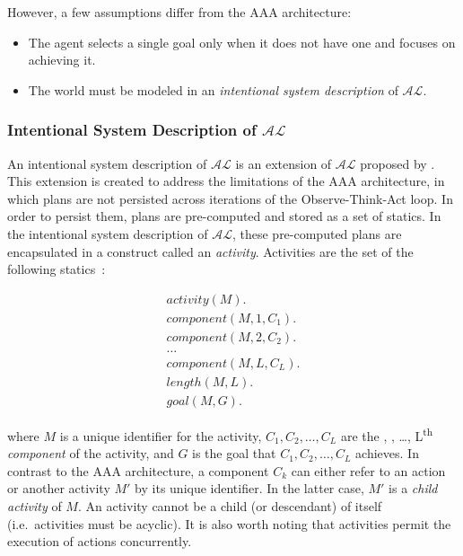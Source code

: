 However, a few assumptions differ from the AAA architecture:

\begin{itemize}
    \item The agent selects a single goal only when it does not have one and focuses on achieving it.
    \item The world must be modeled in an \textit{intentional system description} of $\mathcal{AL}$.
\end{itemize}

\subsubsection{Intentional System Description of $\mathcal{AL}$}
\label{subsubsec:intentional_action_language_al}

An intentional system description of $\mathcal{AL}$ is an extension of $\mathcal{AL}$ proposed by \citet{blount_architecture_2013}.
This extension is created to address the limitations of the AAA architecture, in which plans are not persisted across iterations of the Observe-Think-Act loop.
In order to persist them, plans are pre-computed and stored as a set of statics.
In the intentional system description of $\mathcal{AL}$, these pre-computed plans are encapsulated in a construct called an \textit{activity}.
Activities are the set of the following statics~\citep{blount_architecture_2013, blount_towards_2014}:

\begin{gather}
    activity(M). \\
    component(M, 1, C_1). \\
    component(M, 2, C_2). \\
    \dots \\
    component(M, L, C_L). \\
    length(M, L). \\
    goal(M, G).
\end{gather}

\noindent
where $M$ is a unique identifier for the activity, $C_1, C_2, \dots, C_L$ are the , , \dots, L\textsuperscript{th} \textit{component} of the activity, and $G$ is the goal that $C_1,C_2,\dots,C_L$ achieves.
In contrast to the AAA architecture, a component $C_k$ can either refer to an action or another activity $M'$ by its unique identifier.
In the latter case, $M'$ is a \textit{child activity} of $M$.
An activity cannot be a child (or descendant) of itself (i.e.~activities must be acyclic).
It is also worth noting that activities permit the execution of actions concurrently.

